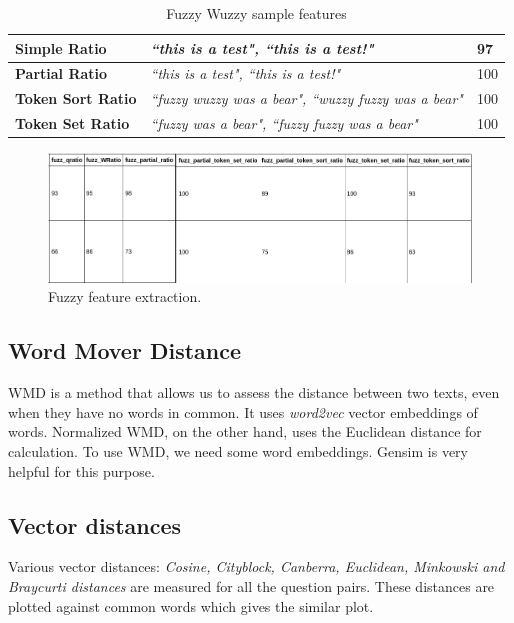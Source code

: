 \begin{table}[]
\begin{center}
\begin{tabular}{|l|l|l|}
\hline
\textbf{Simple Ratio}     & \textit{``this is a test", ``this is a test!"}                           & 97  \\
\hline
\textbf{Partial Ratio}    & \textit{``this is a test", ``this is a test!"}                   & 100 \\ \hline
\textbf{Token Sort Ratio} & \textit{``fuzzy wuzzy was a bear", ``wuzzy fuzzy was a bear"} & 100 \\ \hline
\textbf{Token Set Ratio}  & \textit{``fuzzy was a bear", ``fuzzy fuzzy was a bear"}        & 100 \\ \hline
\end{tabular}
\end{center}
\caption{Fuzzy Wuzzy sample features}
\end{table}

\begin{figure}[tbh]
\begin{center}
	\includegraphics[width = 5.2in]{images/features_II.png}
	\caption{Fuzzy feature extraction.}
	\label{features_I}
\end{center}
\end{figure}


\subsection{Word Mover Distance}
\ac{WMD} is a method that allows us to assess the distance between two texts, even when they have no words in common. It uses \textit{word2vec} vector embeddings of words. Normalized \ac{WMD}, on the other hand, uses the Euclidean distance for calculation. To use \ac{WMD}, we need some word embeddings. Gensim is very helpful for this purpose.

\subsection{Vector distances}
Various vector distances: \textit{Cosine, Cityblock, Canberra, Euclidean, Minkowski and Braycurti distances} are measured for all the question pairs. These distances are plotted against common words which gives the similar plot.

